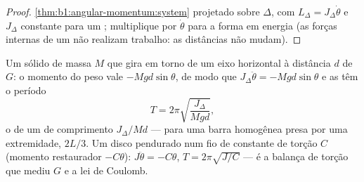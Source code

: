 \begin{proof}
\cref{thm:b1:angular-momentum:system} projetado sobre $\Delta$, com $L_\Delta
= J_\Delta\dot\theta$ e $J_\Delta$ constante para um ; multiplique por
$\dot\theta$ para a forma em energia (as forças internas de um  não
realizam trabalho: as distâncias não mudam).
\end{proof}

\begin{example}\label{ex:b1:systems-of-points:pendulums}
Um sólido de massa $M$ que gira em torno de um eixo horizontal à distância $d$
de $G$: o momento do peso vale $-Mgd\sin\theta$, de modo que $J_\Delta\ddot\theta =
-Mgd\sin\theta$ e as  têm o período
\[
T = 2\pi\sqrt{\frac{J_\Delta}{Mgd}} ,
\]
o de um  de comprimento $J_\Delta/Md$ --- para uma barra
homogênea presa por uma extremidade, $2L/3$. Um disco pendurado num fio de
constante de torção $C$ (momento restaurador $-C\theta$): $J\ddot\theta = -C\theta$, $T = 2\pi\sqrt{J/C}$
--- é a balança de torção que mediu $G$ e a lei de Coulomb.
\end{example}

